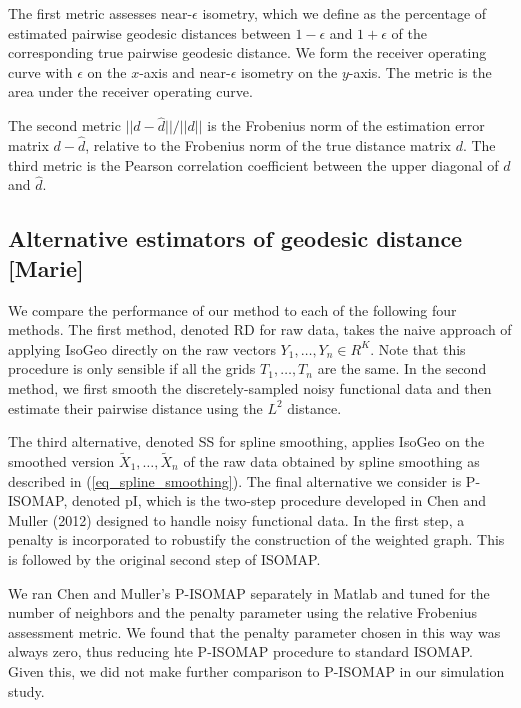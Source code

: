 The first metric assesses near-\(\epsilon\) isometry, which we define as
the percentage of estimated pairwise geodesic distances between
\(1-\epsilon\) and \(1+\epsilon\) of the corresponding true pairwise
geodesic distance. We form the receiver operating curve with
\(\epsilon\) on the \(x\)-axis and near-\(\epsilon\) isometry on the
\(y\)-axis. The metric is the area under the receiver operating curve.

The second metric \(||d-\hat d||/||d||\) is the Frobenius norm of the
estimation error matrix \(d-\hat d\), relative to the Frobenius norm of
the true distance matrix \(d\). The third metric is the Pearson
correlation coefficient between the upper diagonal of \(d\) and
\(\hat d\).

\subsection{Alternative estimators of geodesic distance
{[}Marie{]}}\label{alternative-estimators-of-geodesic-distance-marie}

We compare the performance of our method to each of the following four
methods. The first method, denoted RD for raw data, takes the naive
approach of applying IsoGeo directly on the raw vectors
\(Y_1,\ldots,Y_n \in R^K\). Note that this procedure is only sensible if
all the grids \(T_1,\ldots,T_n\) are the same. In the second method, we
first smooth the discretely-sampled noisy functional data and then
estimate their pairwise distance using the \(L^2\) distance.

The third alternative, denoted SS for spline smoothing, applies IsoGeo
on the smoothed version \(\tilde X_1,\ldots,\tilde X_n\) of the raw data
obtained by spline smoothing as described in
(\ref{eq_spline_smoothing}). The final alternative we consider is
P-ISOMAP, denoted pI, which is the two-step procedure developed in Chen
and Muller (2012) designed to handle noisy functional data. In the first
step, a penalty is incorporated to robustify the construction of the
weighted graph. This is followed by the original second step of ISOMAP.

We ran Chen and Muller's P-ISOMAP separately in Matlab and tuned for the
number of neighbors and the penalty parameter using the relative
Frobenius assessment metric. We found that the penalty parameter chosen
in this way was always zero, thus reducing hte P-ISOMAP procedure to
standard ISOMAP. Given this, we did not make further comparison to
P-ISOMAP in our simulation study.

